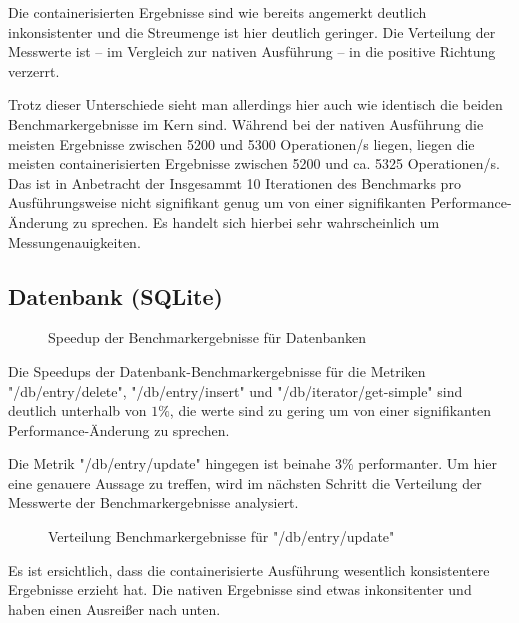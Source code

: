 Die containerisierten Ergebnisse sind wie bereits angemerkt deutlich inkonsistenter und die Streumenge ist hier deutlich geringer. Die Verteilung der Messwerte ist – im Vergleich zur nativen Ausführung – in die positive Richtung verzerrt.  

Trotz dieser Unterschiede sieht man allerdings hier auch wie identisch die beiden Benchmarkergebnisse im Kern sind. Während bei der nativen Ausführung die meisten Ergebnisse zwischen 5200 und 5300 Operationen/s liegen, liegen die meisten containerisierten Ergebnisse zwischen 5200 und ca. 5325 Operationen/s. Das ist in Anbetracht der Insgesammt 10 Iterationen des Benchmarks pro Ausführungsweise nicht signifikant genug um von einer signifikanten Performance-Änderung zu sprechen. Es handelt sich hierbei sehr wahrscheinlich um Messungenauigkeiten. 


\subsection{Datenbank (SQLite)}

\begin{figure}
    \centering
    
    \caption{Speedup der Benchmarkergebnisse für Datenbanken}
    \label{fig:speedup_db}
\end{figure}

\FloatBarrier

Die Speedups der Datenbank-Benchmarkergebnisse für die Metriken "/db/entry/delete", "/db/entry/insert" und "/db/iterator/get-simple" sind deutlich unterhalb von $1\%$, die werte sind zu gering um von einer signifikanten Performance-Änderung zu sprechen. 

Die Metrik "/db/entry/update" hingegen ist beinahe $3\%$ performanter. Um hier eine genauere Aussage zu treffen, wird im nächsten Schritt die Verteilung der Messwerte der Benchmarkergebnisse analysiert.

\begin{figure}
    \centering
    
    \caption{Verteilung Benchmarkergebnisse für "/db/entry/update"}
    \label{fig:mdist_db_entry_update}
\end{figure}

\FloatBarrier

Es ist ersichtlich, dass die containerisierte Ausführung wesentlich konsistentere Ergebnisse erzieht hat. 
Die nativen Ergebnisse sind etwas inkonsitenter und haben einen Ausreißer nach unten. 

